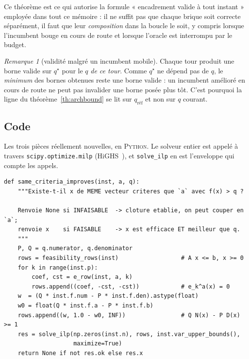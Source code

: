 \documentclass[11pt,a4paper]{article}
\theoremstyle{plain}
\theoremstyle{remark}
\newtheorem{remark}{Remarque}
\newcommand{\qs}{q^{\star}}
\begin{document}
\noindent
Ce théorème est ce qui autorise la formule « encadrement valide à tout
instant » employée dans tout ce mémoire : il ne suffit pas que chaque
brique soit correcte séparément, il faut que leur \emph{composition} dans
la boucle le soit, y compris lorsque l'incumbent bouge en cours de route et
lorsque l'oracle est interrompu par le budget.

\begin{remark}[validité malgré un incumbent mobile]
Chaque tour produit une borne valide sur $\qs$ pour le $q$ \emph{de ce tour}.
Comme $\qs$ ne dépend pas de $q$, le \emph{minimum} des bornes obtenues reste
une borne valide : un incumbent amélioré en cours de route ne peut pas
invalider une borne posée plus tôt. C'est pourquoi la ligne du
théorème~\ref{th:archbound} se lit sur $q_{\text{réf}}$ et non sur $q$
courant.
\end{remark}

\subsection{Code}

Les trois pièces réellement nouvelles, en \textsc{Python}. Le solveur entier
est appelé à travers \texttt{scipy.optimize.milp}
(HiGHS~\cite{huangfu2018}), et
\texttt{solve\_ilp} en est l'enveloppe qui compte les appels.

\begin{lstlisting}[caption={La condition de clôture : UN seul programme de
faisabilité (Alg.~\ref{alg:clot}).},label={lst:clot}]
def same_criteria_improves(inst, a, q):
    """Existe-t-il x de MEME vecteur criteres que `a` avec f(x) > q ?

    Renvoie None si INFAISABLE  -> cloture etablie, on peut couper en `a`;
    renvoie x    si FAISABLE    -> x est efficace ET meilleur que q.
    """
    P, Q = q.numerator, q.denominator
    rows = feasibility_rows(inst)                  # A x <= b, x >= 0
    for k in range(inst.p):
        coef, cst = e_row(inst, a, k)
        rows.append((coef, -cst, -cst))            # e_k^a(x) = 0
    w  = (Q * inst.f.num - P * inst.f.den).astype(float)
    w0 = float(Q * inst.f.a - P * inst.f.b)
    rows.append((w, 1.0 - w0, INF))                # Q N(x) - P D(x) >= 1
    res = solve_ilp(np.zeros(inst.n), rows, inst.var_upper_bounds(),
                    maximize=True)
    return None if not res.ok else res.x
\end{lstlisting}
\end{document}
